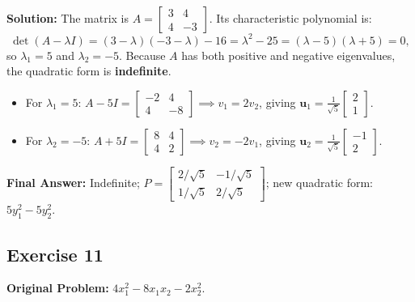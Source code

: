 \documentclass[11pt, letterpaper]{article}
\theoremstyle{definition}
\theoremstyle{remark}
\begin{document}
\textbf{Solution:}
The matrix is $A = \begin{bmatrix} 3 & 4 \\ 4 & -3 \end{bmatrix}$. Its characteristic polynomial is:
\[
\det(A - \lambda I) = (3-\lambda)(-3-\lambda) - 16 = \lambda^2 - 25 = (\lambda - 5)(\lambda + 5) = 0,
\]
so $\lambda_1 = 5$ and $\lambda_2 = -5$. Because $A$ has both positive and negative eigenvalues, the quadratic form is \textbf{indefinite}.
\begin{itemize}
    \item For $\lambda_1 = 5$: $A - 5I = \begin{bmatrix} -2 & 4 \\ 4 & -8 \end{bmatrix} \implies v_1 = 2v_2$, giving $\mathbf{u}_1 = \frac{1}{\sqrt{5}}\begin{bmatrix} 2 \\ 1 \end{bmatrix}$.
    \item For $\lambda_2 = -5$: $A + 5I = \begin{bmatrix} 8 & 4 \\ 4 & 2 \end{bmatrix} \implies v_2 = -2v_1$, giving $\mathbf{u}_2 = \frac{1}{\sqrt{5}}\begin{bmatrix} -1 \\ 2 \end{bmatrix}$.
\end{itemize}
\textbf{Final Answer:} Indefinite; $P = \begin{bmatrix} 2/\sqrt{5} & -1/\sqrt{5} \\ 1/\sqrt{5} & 2/\sqrt{5} \end{bmatrix}$; new quadratic form: $5y_1^2 - 5y_2^2$.

\hrulefill

\subsection*{Exercise 11}
\textbf{Original Problem:} $4x_1^2 - 8x_1x_2 - 2x_2^2$.
\end{document}
